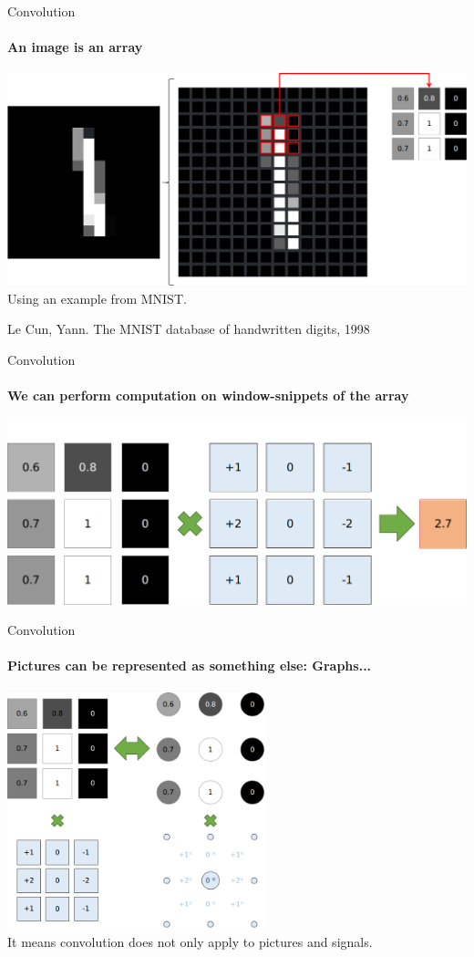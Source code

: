 \documentclass{beamer}
\begin{document}
\begin{darkframes}
    \begin{frame}[label=lists]{Convolution}
        \framesubtitle{An image is an array}
        \includegraphics[width=\textwidth]{fibeamer/logo/zut/convolution.png}
        Using an example from MNIST.
        \clearpage
        \raggedright\tiny{Le Cun, Yann. The MNIST database of handwritten digits, 1998}
    \end{frame}

    \begin{frame}[label=lists]{Convolution}
        \framesubtitle{We can perform computation on window-snippets of the array}
        \includegraphics[width=\textwidth]{fibeamer/logo/zut/sobel.png}
    \end{frame}
    
    \begin{frame}[label=lists]{Convolution}
        \framesubtitle{Pictures can be represented as something else: Graphs...}
        \centering\includegraphics[width=0.56\textwidth]{fibeamer/logo/zut/correspondance.png}\\
        It means convolution does not only apply to pictures and signals.
    \end{frame}
    

\end{darkframes}
\end{document}

